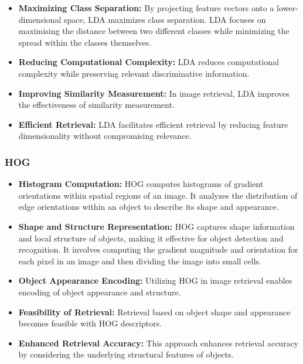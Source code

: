 \documentclass[a4paper]{article}
\theoremstyle{plain}
\theoremstyle{definition}
\begin{document}
{\begin{itemize}
    \item[] \textbf{Maximizing Class Separation:} By projecting feature vectors onto a lower-dimensional space, LDA maximizes class separation. LDA focuses on maximising the distance between two different classes while minimizing the spread within the classes themselves.
    
    \item[] \textbf{Reducing Computational Complexity:} LDA reduces computational complexity while preserving relevant discriminative information.
    
    \item[] \textbf{Improving Similarity Measurement:} In image retrieval, LDA improves the effectiveness of similarity measurement.
    
    \item[] \textbf{Efficient Retrieval:} LDA facilitates efficient retrieval by reducing feature dimensionality without compromising relevance.
\end{itemize}
\subsubsection {HOG}
\begin{itemize}
    \item[] \textbf{Histogram Computation:} HOG computes histograms of gradient orientations within spatial regions of an image. It analyzes the distribution of edge orientations within an object to describe its shape and appearance. 
    
    \item[] \textbf{Shape and Structure Representation:} HOG captures shape information and local structure of objects, making it effective for object detection and recognition. It involves computing the gradient magnitude and orientation for each pixel in an image and then dividing the image into small cells.
    
    \item[] \textbf{Object Appearance Encoding:} Utilizing HOG in image retrieval enables encoding of object appearance and structure.
    
    \item[] \textbf{Feasibility of Retrieval:} Retrieval based on object shape and appearance becomes feasible with HOG descriptors.
    
    \item[] \textbf{Enhanced Retrieval Accuracy:} This approach enhances retrieval accuracy by considering the underlying structural features of objects.
\end{itemize}

}
\end{document}
